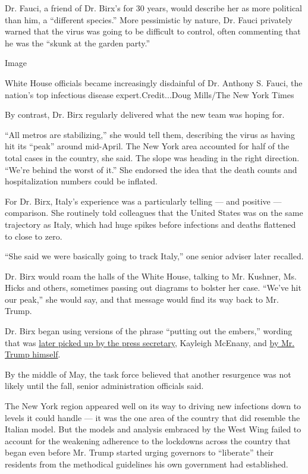 Dr. Fauci, a friend of Dr. Birx's for 30 years, would describe her as
more political than him, a ``different species.'' More pessimistic by
nature, Dr. Fauci privately warned that the virus was going to be
difficult to control, often commenting that he was the ``skunk at the
garden party.''

Image

White House officials became increasingly disdainful of Dr. Anthony S.
Fauci, the nation's top infectious disease expert.Credit...Doug
Mills/The New York Times

By contrast, Dr. Birx regularly delivered what the new team was hoping
for.

``All metros are stabilizing,'' she would tell them, describing the
virus as having hit its ``peak'' around mid-April. The New York area
accounted for half of the total cases in the country, she said. The
slope was heading in the right direction. ``We're behind the worst of
it.'' She endorsed the idea that the death counts and hospitalization
numbers could be inflated.

For Dr. Birx, Italy's experience was a particularly telling --- and
positive --- comparison. She routinely told colleagues that the United
States was on the same trajectory as Italy, which had huge spikes before
infections and deaths flattened to close to zero.

``She said we were basically going to track Italy,'' one senior adviser
later recalled.

Dr. Birx would roam the halls of the White House, talking to Mr.
Kushner, Ms. Hicks and others, sometimes passing out diagrams to bolster
her case. ``We've hit our peak,'' she would say, and that message would
find its way back to Mr. Trump.

Dr. Birx began using versions of the phrase ``putting out the embers,''
wording that was
\href{https://www.whitehouse.gov/briefings-statements/press-briefing-press-secretary-kayleigh-mcenany-062220/}{later
picked up by the press secretary}, Kayleigh McEnany, and
\href{https://twitter.com/realDonaldTrump/status/1276363261957603328?s=20}{by
Mr. Trump himself}.

By the middle of May, the task force believed that another resurgence
was not likely until the fall, senior administration officials said.

The New York region appeared well on its way to driving new infections
down to levels it could handle --- it was the one area of the country
that did resemble the Italian model. But the models and analysis
embraced by the West Wing failed to account for the weakening adherence
to the lockdowns across the country that began even before Mr. Trump
started urging governors to ``liberate'' their residents from the
methodical guidelines his own government had established.

